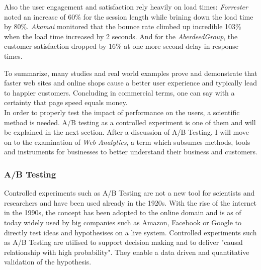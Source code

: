 Also the user engagement and satisfaction rely heavily on load times:  \textit{Forrester} noted an increase of 60\% for the session length while brining down the load time by 80\%.
\textit{Akamai} monitored that the bounce rate climbed up incredible 103\% when the load time increased by 2 seconds.
And for the \textit{AberdeedGroup}, the customer satisfaction dropped by 16\% at one more second delay in response times.



To summarize, many studies and real world examples prove and demonstrate that faster web sites and online shops cause a better user experience and typically lead to happier customers. 
Concluding in commercial terms, one can say with a certainty that page speed equals money.
\\

In order to properly test the impact of performance on the users, a scientific method is needed.
A/B testing as a controlled experiment is one of them and will be explained in the next section.
After a discussion of A/B Testing, I will move on to the examination of \textit{Web Analytics}, a term which subsumes methods, tools and instruments for businesses to better understand their business and customers.


\subsubsection{A/B Testing}



Controlled experiments such as A/B Testing are not a new tool for scientists and researchers and have been used already in the 1920s. %
With the rise of the internet in the 1990s, the concept has been adopted to the online domain and is as of today widely used by big companies such as Amazon, Facebook or Google to directly test ideas and hypothesises on a live system.
Controlled experiments such as A/B Testing are utilised to support decision making and to deliver "causal relationship with high probability". %
They enable a data driven and quantitative validation of the hypothesis. %

